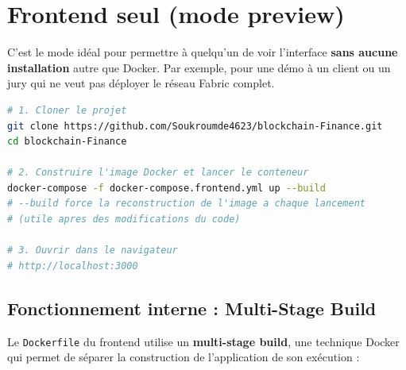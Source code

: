 \documentclass[12pt,a4paper,twoside]{report}
\begin{document}
\section{Frontend seul (mode preview)}

\begin{dangerbox}
C'est le mode idéal pour permettre à quelqu'un de voir l'interface \textbf{sans aucune installation} autre que Docker. Par exemple, pour une démo à un client ou un jury qui ne veut pas déployer le réseau Fabric complet.
\end{dangerbox}

\begin{lstlisting}[language=bash, caption=Lancement du frontend via Docker]
# 1. Cloner le projet
git clone https://github.com/Soukroumde4623/blockchain-Finance.git
cd blockchain-Finance

# 2. Construire l'image Docker et lancer le conteneur
docker-compose -f docker-compose.frontend.yml up --build
# --build force la reconstruction de l'image a chaque lancement
# (utile apres des modifications du code)

# 3. Ouvrir dans le navigateur
# http://localhost:3000
\end{lstlisting}

\subsection{Fonctionnement interne : Multi-Stage Build}

Le \texttt{Dockerfile} du frontend utilise un \textbf{multi-stage build}, une technique Docker qui permet de séparer la construction de l'application de son exécution :
\end{document}
